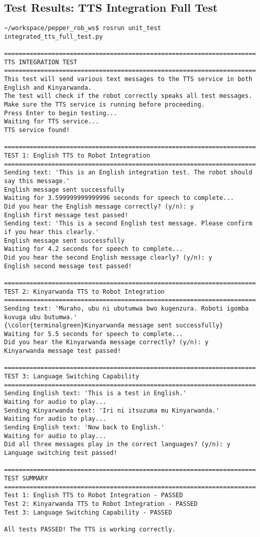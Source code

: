 \documentclass{CSSRforAfrica}
\begin{document}
\subsection*{Test Results: TTS Integration Full Test}
\begin{lstlisting}[style=commandstyle]
~/workspace/pepper_rob_ws$ rosrun unit_test integrated_tts_full_test.py

=====================================================================
TTS INTEGRATION TEST
=====================================================================
This test will send various text messages to the TTS service in both English and Kinyarwanda.
The test will check if the robot correctly speaks all test messages.
Make sure the TTS service is running before proceeding.
Press Enter to begin testing...
Waiting for TTS service...
TTS service found!

=====================================================================
TEST 1: English TTS to Robot Integration
=====================================================================
Sending text: 'This is an English integration test. The robot should say this message.'
English message sent successfully
Waiting for 3.599999999999996 seconds for speech to complete...
Did you hear the English message correctly? (y/n): y
English first message test passed!
Sending text: 'This is a second English test message. Please confirm if you hear this clearly.'
English message sent successfully
Waiting for 4.2 seconds for speech to complete...
Did you hear the second English message clearly? (y/n): y
English second message test passed!

=====================================================================
TEST 2: Kinyarwanda TTS to Robot Integration
=====================================================================
Sending text: 'Muraho, ubu ni ubutumwa bwo kugenzura. Roboti igomba kuvuga ubu butumwa.'
{\color{terminalgreen}Kinyarwanda message sent successfully}
Waiting for 5.5 seconds for speech to complete...
Did you hear the Kinyarwanda message correctly? (y/n): y
Kinyarwanda message test passed!

=====================================================================
TEST 3: Language Switching Capability
=====================================================================
Sending English text: 'This is a test in English.'
Waiting for audio to play...
Sending Kinyarwanda text: 'Iri ni itsuzuma mu Kinyarwanda.'
Waiting for audio to play...
Sending English text: 'Now back to English.'
Waiting for audio to play...
Did all three messages play in the correct languages? (y/n): y
Language switching test passed!

=====================================================================
TEST SUMMARY
=====================================================================
Test 1: English TTS to Robot Integration - PASSED
Test 2: Kinyarwanda TTS to Robot Integration - PASSED
Test 3: Language Switching Capability - PASSED

All tests PASSED! The TTS is working correctly.

\end{lstlisting}
\end{document}
